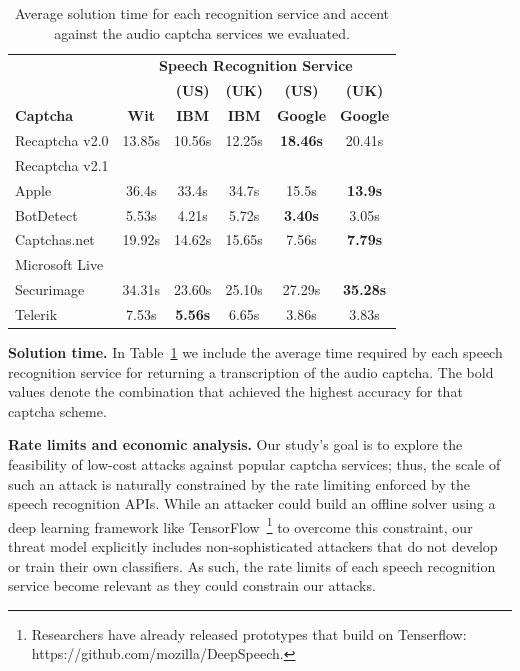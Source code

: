 \begin{table}[t]
\centering
\caption{Average solution time for each recognition service and accent against the audio captcha services we evaluated.}
\begin{tabular}{lccccc}
\toprule
&\multicolumn{5}{c}{\textbf{Speech Recognition Service}}\\
\cmidrule{2-6}
& & \textbf{(US)} & \textbf{(UK)} & \textbf{(US)} & \textbf{(UK)} \\
\textbf{Captcha}&  \textbf{Wit} & \textbf{IBM} & \textbf{IBM} & \textbf{Google} & \textbf{Google} \\
\hline
Recaptcha v2.0 & 13.85s & 10.56s  & 12.25s & \textbf{18.46s} & 20.41s \\
\rowcolor{Gray}
Recaptcha v2.1 &  &  &  & & \\
Apple  & 36.4s & 33.4s  & 34.7s & 15.5s & \textbf{13.9s} \\
\rowcolor{Gray}
BotDetect  & 5.53s  & 4.21s & 5.72s & \textbf{3.40s} & 3.05s \\
Captchas.net  & 19.92s  & 14.62s  & 15.65s  & 7.56s & \textbf{7.79s} \\
\rowcolor{Gray}
Microsoft Live & &  &  & & \\
Securimage  & 34.31s & 23.60s & 25.10s  & 27.29s & \textbf{35.28s} \\
\rowcolor{Gray}
Telerik  & 7.53s & \textbf{5.56s} & 6.65s & 3.86s & 3.83s \\
\bottomrule
\end{tabular}
\label{tab:solution_time}
\end{table}

\textbf{Solution time.} In Table~\ref{tab:solution_time} we include the average time required by each speech recognition 
service for returning a transcription of the audio captcha. The bold values denote the combination that achieved the highest 
accuracy for that captcha scheme. 


\textbf{Rate limits and economic analysis.} Our study's goal is to explore the feasibility of low-cost attacks 
against popular captcha services; thus, the scale of such an attack is naturally constrained by the rate
limiting enforced by the speech recognition APIs. While an attacker could build an offline solver
using a deep learning framework like TensorFlow~\cite{abadi2016tensorflow}\footnote{Researchers have already
released prototypes that build on Tenserflow: {https://github.com/mozilla/DeepSpeech}.} to overcome this constraint,
our threat model explicitly includes non-sophisticated attackers that do not develop or train their own 
classifiers. As such, the rate limits of each speech recognition service become relevant as they could
constrain our attacks.

